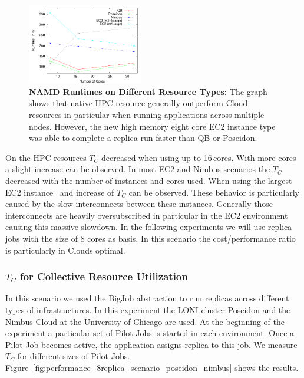 \documentclass[conference,final]{IEEEtran}
\newcommand{\tc}{$T_{C}$ }
\begin{document}
\begin{figure}[htbp]
    \centering
    \includegraphics[width=0.45\textwidth]{performance/namd_run.pdf}
    \caption{\textbf{NAMD Runtimes on Different Resource Types: } The
      graph shows that native HPC resource generally outperform Cloud
      resources in particular when running applications across
      multiple nodes. However, the new high memory eight core EC2
      instance type was able to complete a replica run faster than QB
      or Poseidon.}
    \label{fig:performance_namd_run}
\end{figure}

On the HPC resources \tc decreased when using up to 16\,cores. With
more cores a slight increase can be observed. In most EC2 and Nimbus
scenarios the \tc decreased with the number of instances and cores
used. When using the largest EC2 instance~\cite{new-ec2} and increase
of \tc can be observed. These behavior is particularly caused by the
slow interconnects between these instances. Generally those
interconnects are heavily oversubscribed in particular in the EC2
environment causing this massive slowdown. In the following
experiments we will use replica jobs with the size of 8 cores as
basis. In this scenario the cost/performance ratio is particularly in
Clouds optimal.

\subsubsection{\tc for Collective Resource Utilization}

In this scenario we used the BigJob abstraction to run replicas across
different types of infrastructures. In this experiment the LONI
cluster Poseidon and the Nimbus Cloud at the University of Chicago are
used. At the beginning of the experiment a particular set of
Pilot-Jobs is started in each environment. Once a Pilot-Job becomes
active, the application assigns replica to this job. We measure \tc
for different sizes of
Pilot-Jobs. Figure~\ref{fig:performance_8replica_scenario_poseidon_nimbus}
shows the results.
\end{document}
